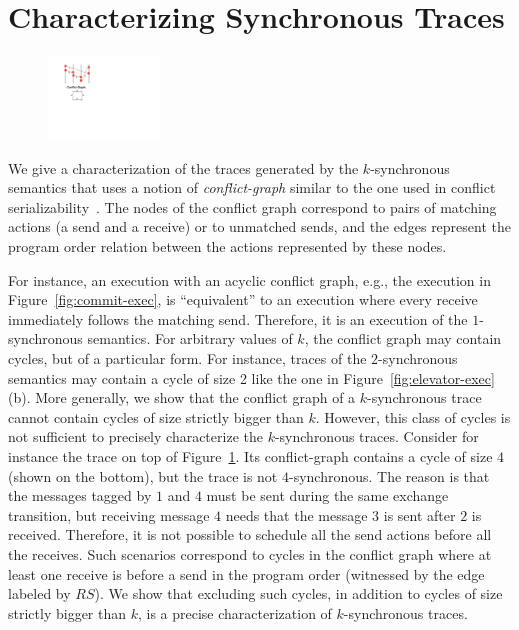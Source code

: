 \section{Characterizing Synchronous Traces}\label{sec:characterizations}

\begin{figure}
\vspace{-5mm}
\includegraphics[width=3cm]{ex-rs-cycle.pdf}
\caption{ }
\label{fig:ex-rs-cycle}
\vspace{-8mm}
\end{figure}
We give a characterization of the traces generated by the $k$-synchronous semantics that uses a notion of \emph{conflict-graph} similar to the one used in conflict serializability~\cite{journals/jacm/Papadimitriou79b}. The nodes of the conflict graph correspond to pairs of matching actions (a send and a receive) or to unmatched sends, and the edges represent the program order relation between the actions represented by these nodes. 

For instance, an execution with an acyclic conflict graph, e.g., the execution in Figure~\ref{fig:commit-exec}, is ``equivalent'' to an execution where every receive immediately follows the matching send. 
Therefore, it is an execution of the $1$-synchronous semantics. For arbitrary values of $k$, the conflict graph may contain cycles, but of a particular form. For instance, traces of the $2$-synchronous semantics may contain a cycle of size 2 like the one in Figure~\ref{fig:elevator-exec}(b). More generally, we show that the conflict graph of a $k$-synchronous trace cannot contain cycles of size strictly bigger than $k$. However, this class of cycles is not sufficient to precisely characterize the $k$-synchronous traces. Consider for instance the trace on top of Figure~\ref{fig:ex-rs-cycle}. Its conflict-graph contains a cycle of size $4$ (shown on the bottom), but the trace is not $4$-synchronous. The reason is that the messages tagged by $1$ and $4$ must be sent during the same exchange transition, but receiving message $4$ needs that the message $3$ is sent after $2$ is received. Therefore, it is not possible to schedule all the send actions before all the receives. Such scenarios correspond to cycles in the conflict graph where at least one receive is before a send in the program order (witnessed by the edge labeled by $RS$). We show that excluding such cycles, in addition to cycles of size strictly bigger than $k$, is a precise characterization of $k$-synchronous traces.



